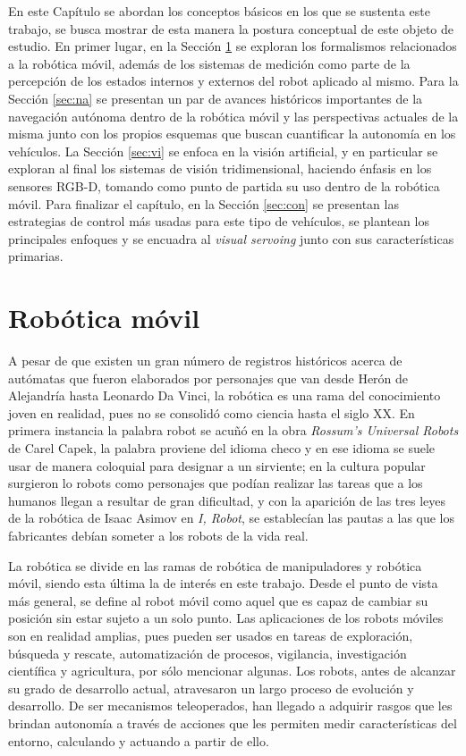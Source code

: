En este Capítulo se abordan los conceptos básicos en los que se sustenta este trabajo, se busca mostrar de esta manera la postura conceptual de este objeto de estudio. En primer lugar, en la Sección \ref{sec:rm} se exploran los formalismos relacionados a la robótica móvil, además de los sistemas de medición como parte de la percepción de los estados internos y externos del robot aplicado al mismo. Para la Sección \ref{sec:na} se presentan un par de avances históricos importantes de la navegación autónoma dentro de la robótica móvil y las perspectivas actuales de la misma junto con los propios esquemas que buscan cuantificar la autonomía en los vehículos. La Sección \ref{sec:vi} se enfoca en la visión artificial, y en particular se exploran al final los sistemas de visión tridimensional, haciendo énfasis en los sensores RGB-D, tomando como punto de partida su uso dentro de la robótica móvil. Para finalizar el capítulo, en la Sección \ref{sec:con} se presentan las estrategias de control más usadas para este tipo de vehículos, se plantean los principales enfoques y se encuadra al {\it visual servoing} junto con sus características primarias.
\section{Robótica móvil}
\label{sec:rm}
A pesar de que existen un gran número de registros históricos acerca de autómatas que fueron elaborados por personajes que van desde Herón de Alejandría hasta Leonardo Da Vinci, la robótica es una rama del conocimiento joven en realidad, pues no se consolidó como ciencia hasta el siglo XX. En primera instancia la palabra robot se acuñó en la obra {\it Rossum's Universal Robots} de Carel Capek, la palabra proviene del idioma checo y en ese idioma se suele usar de manera coloquial para designar a un sirviente; en la cultura popular surgieron lo robots como personajes que podían realizar las tareas que a los humanos llegan a resultar de gran dificultad, y con la aparición de las tres leyes de la robótica de Isaac Asimov en {\it I, Robot}, se establecían las pautas a las que los fabricantes debían someter a los robots de la vida real.
\par La robótica se divide en las ramas de robótica de manipuladores y robótica móvil, siendo esta última la de interés en este trabajo. Desde el punto de vista más general, se define al robot móvil como aquel que es capaz de cambiar su posición sin estar sujeto a un solo punto. Las aplicaciones de los robots móviles son en realidad amplias, pues pueden ser usados en tareas de exploración, búsqueda y rescate, automatización de procesos, vigilancia, investigación científica y agricultura, por sólo mencionar algunas. Los robots, antes de alcanzar su grado de desarrollo actual, atravesaron un largo proceso de evolución y desarrollo. De ser mecanismos teleoperados, han llegado a adquirir rasgos que les brindan autonomía a través de acciones que les permiten medir características del entorno, calculando y actuando a partir de ello.
